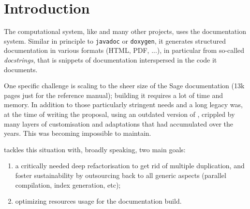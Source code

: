 \documentclass{deliverablereport}
\author{Jeroen Demeyer}
\begin{document}
\maketitle
\tableofcontents




\section{Introduction}

The \Sage computational system, like \Python and many other \Python
projects, uses the \Sphinx documentation system. Similar in principle
to \lstinline{javadoc} or \lstinline{doxygen}, it generates structured
documentation in various formats (HTML, PDF, ...), in particular from
so-called \emph{docstrings}, that is snippets of documentation
interspersed in the code it documents.

One specific challenge is scaling to the sheer size of the Sage
documentation (13k pages just for the reference manual); building it
requires a lot of time and memory. In addition to those particularly
stringent needs and a long legacy \Sage was, at the time of writing
the proposal, using an outdated version of \Sphinx, crippled by many
layers of customisation and adaptations that had accumulated over the
years. This was becoming impossible to maintain.

 tackles this situation with, broadly
speaking, two main goals:
\begin{enumerate}
\item a critically needed deep refactorisation to get rid of multiple
  duplication, and foster sustainability by outsourcing back to
  \Sphinx all generic aspects (parallel compilation, index generation,
  etc);
\item optimizing resources usage for the documentation build.
\end{enumerate}
\end{document}
